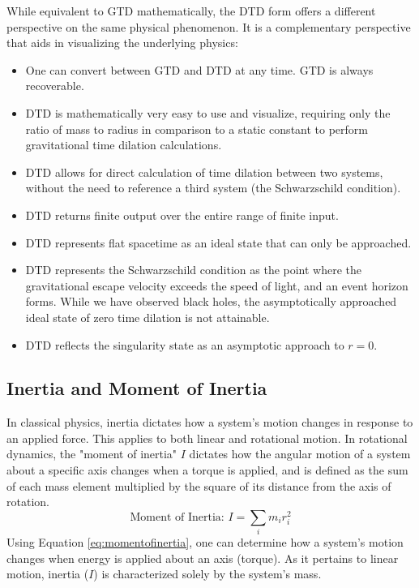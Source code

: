 \documentclass[twoside,twocolumn,9pt,fleqn]{article}
\begin{document}
While equivalent to GTD mathematically, the DTD form offers a different perspective on the same physical phenomenon. It is a complementary perspective that aids in visualizing the underlying physics:
\begin{itemize}
\item One can convert between GTD and DTD at any time. GTD is always recoverable.
\item $\mathrm{DTD}$ is mathematically very easy to use and visualize, requiring only the ratio of mass to radius in comparison to a static constant to perform gravitational time dilation calculations. 
\item $\mathrm{DTD}$ allows for direct calculation of time dilation between two systems, without the need to reference a third system (the Schwarzschild condition).
\item $\mathrm{DTD}$ returns finite output over the entire range of finite input.
\item $\mathrm{DTD}$ represents flat spacetime as an ideal state that can only be approached.
\item $\mathrm{DTD}$ represents the Schwarzschild condition as the point where the gravitational escape velocity exceeds the speed of light, and an event horizon forms. While we have observed black holes, the asymptotically approached ideal state of zero time dilation is not attainable.
\item $\mathrm{DTD}$ reflects the singularity state as an asymptotic approach to $r=0$.
\end{itemize}


\subsection{Inertia and Moment of Inertia}
In classical physics, inertia dictates how a system's motion changes in response to an applied force. This applies to both linear and rotational motion.
In rotational dynamics, the "moment of inertia"\cite{goldstein2002} $I$ dictates how the angular motion of a system about a specific axis changes when a torque is applied, and is defined as the sum of each mass element multiplied by the square of its distance from the axis of rotation.
\begin{equation}
\text{Moment of Inertia: }
I = \sum_i m_i r_i^2
\label{eq:momentofinertia}
\end{equation}
Using Equation \eqref{eq:momentofinertia}, one can determine how a system's motion changes when energy is applied about an axis (torque). 
As it pertains to linear motion, inertia ($I$) is characterized solely by the system's mass.
\end{document}
